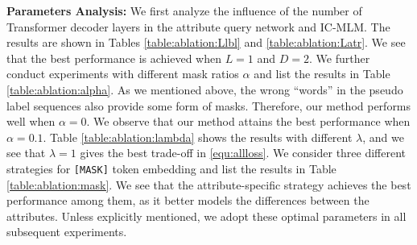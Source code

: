 \documentclass[runningheads]{llncs}
\begin{document}
\textbf{Parameters Analysis:} We first analyze the influence of the number of Transformer decoder layers in the attribute query network and IC-MLM. The results are shown in Tables \ref{table:ablation:Llbl} and \ref{table:ablation:Latr}. We see that the best performance is achieved when $L =1$ and $D = 2$. We further conduct experiments with different mask ratios $\alpha$ and list the results in Table \ref{table:ablation:alpha}. As we mentioned above, the wrong ``words'' in the pseudo label sequences also provide some form of masks. Therefore, our method performs well when $\alpha = 0$. We observe that our method attains the best performance when $\alpha =0.1$. Table \ref{table:ablation:lambda} shows the results with different $\lambda$, and we see that $\lambda = 1$ gives the best trade-off in \eqref{equ:allloss}. We consider three different strategies for \texttt{[MASK]} token embedding and list the results in Table \ref{table:ablation:mask}. We see that the 
attribute-specific strategy achieves the best performance among them, as it better models the differences between the attributes.
Unless explicitly mentioned, we adopt these optimal parameters in all subsequent experiments.
\end{document}

